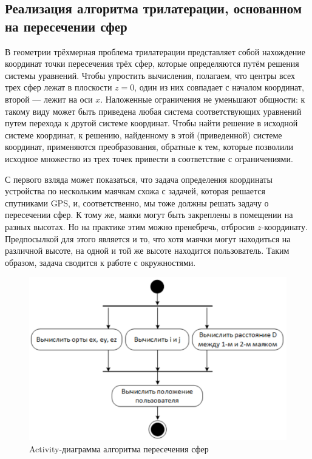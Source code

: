 \subsection{Реализация алгоритма трилатерации, основанном на пересечении сфер}

В геометрии трёхмерная проблема трилатерации представляет собой нахождение координат точки пересечения трёх сфер, которые определяются путём решения системы уравнений. Чтобы упростить вычисления, полагаем, что центры всех трех сфер лежат в плоскости $z=0$, один из них совпадает с началом координат, второй — лежит на оси $x$. Наложенные ограничения не уменьшают общности: к такому виду может быть приведена любая система соответствующих уравнений путем перехода к другой системе координат. Чтобы найти решение в исходной системе координат, к решению, найденному в этой (приведенной) системе координат, применяются преобразования, обратные к тем, которые позволили исходное множество из трех точек привести в соответствие с ограничениями.

С первого взляда может показаться, что задача определения координаты устройства по нескольким маячкам схожа с задачей, которая решается спутниками GPS, и, соответственно, мы тоже должны решать задачу о пересечении сфер. К тому же, маяки могут быть закреплены в помещении на разных высотах. Но на практике этим можно пренебречь, отбросив $z$-координату. Предпосылкой для этого является и то, что хотя маячки могут находиться на различной высоте, на одной и той же высоте находится пользователь. Таким образом, задача сводится к работе с окружностями.

\begin{figure}
    \centering
    \includegraphics[scale=0.5]{img/sphereIntAct}
    \caption{Activity-диаграмма алгоритма пересечения сфер}
\end{figure}